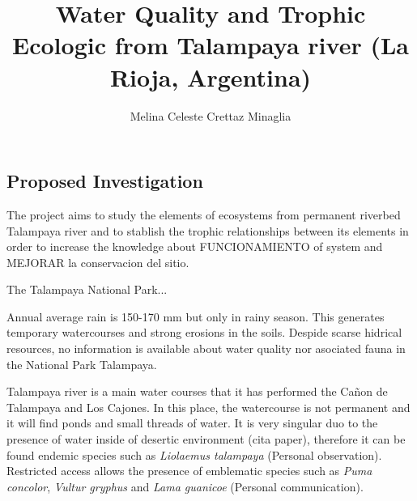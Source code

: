 \documentclass[11pt,a4paper,oneside]{article}
\title{Water Quality and Trophic Ecologic from Talampaya river (La Rioja, Argentina)}
\date{}
\author{Melina Celeste Crettaz Minaglia}
\begin{document}

\maketitle
\subsection*{Proposed Investigation}
The project aims to study the elements of ecosystems from permanent riverbed Talampaya river and to stablish the trophic relationships between its elements in order to increase the knowledge about FUNCIONAMIENTO of system and MEJORAR la conservacion del sitio. 

\bigskip
\bigksip

The Talampaya National Park...

Annual average rain is 150-170 mm but only in rainy season. This generates temporary watercourses and strong erosions in the soils. Despide scarse hidrical resources, no information is available about water quality nor asociated fauna in the National Park Talampaya. 

Talampaya river is a main water courses that it has performed the Cañon de Talampaya and Los Cajones. In this place, the watercourse is not permanent and it will find ponds and small threads of water. It is very singular duo to the presence of water inside of desertic environment (cita paper), therefore it can be found endemic species such as \textit{Liolaemus talampaya} (Personal observation). Restricted access allows the presence of emblematic species such as \textit{Puma concolor}, \textit{Vultur gryphus} and \textit{Lama guanicoe} (Personal communication).
\end{document}
